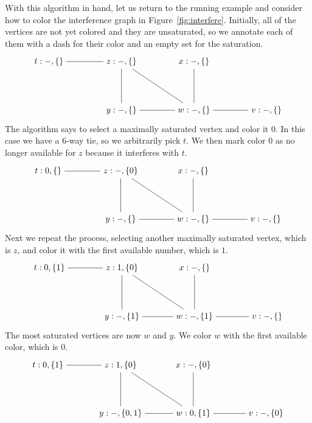 \documentclass[11pt]{book}
\begin{document}
With this algorithm in hand, let us return to the running example and
consider how to color the interference graph in
Figure~\ref{fig:interfere}. Initially, all of the vertices are not yet
colored and they are unsaturated, so we annotate each of them with a
dash for their color and an empty set for the saturation.
\[
\begin{tikzpicture}[baseline=(current  bounding  box.center)]
\node (t1) at (0,2) {$t:-,\{\}$};
\node (z) at (3,2)  {$z:-,\{\}$};
\node (x) at (6,2)  {$x:-,\{\}$};
\node (y) at (3,0)  {$y:-,\{\}$};
\node (w) at (6,0)  {$w:-,\{\}$};
\node (v) at (9,0)  {$v:-,\{\}$};

\draw (t1) to (z);
\draw (z) to (y);
\draw (z) to (w);
\draw (x) to (w);
\draw (y) to (w);
\draw (v) to (w);
\end{tikzpicture}
\]
The algorithm says to select a maximally saturated vertex and color it
$0$. In this case we have a 6-way tie, so we arbitrarily pick
$t$. We then mark color $0$ as no longer available for $z$ because
it interferes with $t$.
\[
\begin{tikzpicture}[baseline=(current  bounding  box.center)]
\node (t1) at (0,2) {$t:0,\{\}$};
\node (z) at (3,2)  {$z:-,\{0\}$};
\node (x) at (6,2)  {$x:-,\{\}$};
\node (y) at (3,0)  {$y:-,\{\}$};
\node (w) at (6,0)  {$w:-,\{\}$};
\node (v) at (9,0)  {$v:-,\{\}$};

\draw (t1) to (z);
\draw (z) to (y);
\draw (z) to (w);
\draw (x) to (w);
\draw (y) to (w);
\draw (v) to (w);
\end{tikzpicture}
\]
Next we repeat the process, selecting another maximally saturated
vertex, which is $z$, and color it with the first available number,
which is $1$.
\[
\begin{tikzpicture}[baseline=(current  bounding  box.center)]
\node (t1) at (0,2) {$t:0,\{1\}$};
\node (z) at (3,2)  {$z:1,\{0\}$};
\node (x) at (6,2)  {$x:-,\{\}$};
\node (y) at (3,0)  {$y:-,\{1\}$};
\node (w) at (6,0)  {$w:-,\{1\}$};
\node (v) at (9,0)  {$v:-,\{\}$};

\draw (t1) to (z);
\draw (z) to (y);
\draw (z) to (w);
\draw (x) to (w);
\draw (y) to (w);
\draw (v) to (w);
\end{tikzpicture}
\]
The most saturated vertices are now $w$ and $y$. We color $w$ with the
first available color, which is $0$.
\[
\begin{tikzpicture}[baseline=(current  bounding  box.center)]
\node (t1) at (0,2) {$t:0,\{1\}$};
\node (z) at (3,2)  {$z:1,\{0\}$};
\node (x) at (6,2)  {$x:-,\{0\}$};
\node (y) at (3,0)  {$y:-,\{0,1\}$};
\node (w) at (6,0)  {$w:0,\{1\}$};
\node (v) at (9,0)  {$v:-,\{0\}$};

\draw (t1) to (z);
\draw (z) to (y);
\draw (z) to (w);
\draw (x) to (w);
\draw (y) to (w);
\draw (v) to (w);
\end{tikzpicture}
\]
\end{document}
